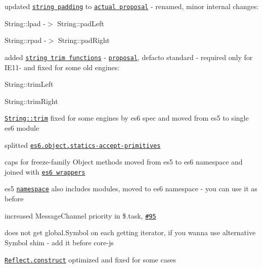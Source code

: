 \begin{DoxyItemize}
\item updated \href{https://github.com/zloirock/core-js/#ecmascript-7-proposals}{\tt string padding} to \href{https://github.com/ljharb/proposal-string-pad-left-right}{\tt actual proposal} -\/ renamed, minor internal changes\+:
\begin{DoxyItemize}
\item {\ttfamily String\+::lpad} -\/$>$ {\ttfamily String\+::pad\+Left}
\item {\ttfamily String\+::rpad} -\/$>$ {\ttfamily String\+::pad\+Right}
\end{DoxyItemize}
\item added \href{#ecmascript-7-proposals}{\tt string trim functions} -\/ \href{https://github.com/sebmarkbage/ecmascript-string-left-right-trim}{\tt proposal}, defacto standard -\/ required only for I\+E11-\/ and fixed for some old engines\+:
\begin{DoxyItemize}
\item {\ttfamily String\+::trim\+Left}
\item {\ttfamily String\+::trim\+Right}
\end{DoxyItemize}
\item \href{https://github.com/zloirock/core-js/#ecmascript-6-string}{\tt {\ttfamily String\+::trim}} fixed for some engines by es6 spec and moved from {\ttfamily es5} to single {\ttfamily es6} module
\item splitted \href{https://github.com/zloirock/core-js/#ecmascript-6-object}{\tt {\ttfamily es6.\+object.\+statics-\/accept-\/primitives}}
\item caps for {\ttfamily freeze}-\/family {\ttfamily Object} methods moved from {\ttfamily es5} to {\ttfamily es6} namespace and joined with \href{https://github.com/zloirock/core-js/#ecmascript-6-object}{\tt es6 wrappers}
\item {\ttfamily es5} \href{https://github.com/zloirock/core-js/#commonjs}{\tt namespace} also includes modules, moved to {\ttfamily es6} namespace -\/ you can use it as before
\item increased {\ttfamily Message\+Channel} priority in {\ttfamily \$.task}, \href{https://github.com/zloirock/core-js/issues/95}{\tt \#95}
\item does not get {\ttfamily global.\+Symbol} on each getting iterator, if you wanna use alternative {\ttfamily Symbol} shim -\/ add it before {\ttfamily core-\/js}
\item \href{https://github.com/zloirock/core-js/#ecmascript-6-reflect}{\tt {\ttfamily Reflect.\+construct}} optimized and fixed for some cases

\end{DoxyItemize}
